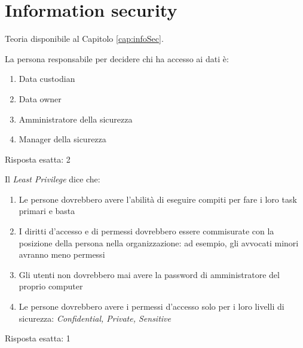 \chapter{Information security}
\label{EsInfoSec1}
Teoria disponibile al Capitolo \ref{cap:infoSec}.

\begin{Exercise} [
  title={Gestione dei dati},
  label={infoSec1}
 ]
 
 \Question La persona responsabile per decidere chi ha accesso ai dati è:
 \begin{enumerate}
   \item Data custodian
   \item Data owner
   \item Amministratore della sicurezza
   \item Manager della sicurezza
 \end{enumerate}
\end{Exercise}


\begin{Answer} [
  ref={infoSec1},
  number={1}
  ]
  
  \Question Risposta esatta: 2
  
\end{Answer}


\begin{Exercise} [
  title={Gestione dei dati},
  label={infoSec2}
  ]
  
  \Question Il \textit{Least Privilege} dice che:
  \begin{enumerate}
    \item Le persone dovrebbero avere l'abilità di eseguire compiti per fare i 
    loro task primari e basta
    \item I diritti d'accesso e di permessi dovrebbero essere commisurate con 
    la posizione della persona nella organizzazione: ad esempio, gli avvocati 
    minori avranno meno permessi
    \item Gli utenti non dovrebbero mai avere la password di amministratore del 
    proprio computer
    \item Le persone dovrebbero avere i permessi d'accesso solo per i loro 
    livelli di sicurezza: \textit{Confidential, Private, Sensitive}
  \end{enumerate}
\end{Exercise}


\begin{Answer} [
  ref={infoSec2},
  number={2}
  ]
  
  \Question Risposta esatta: 1
  
\end{Answer}

